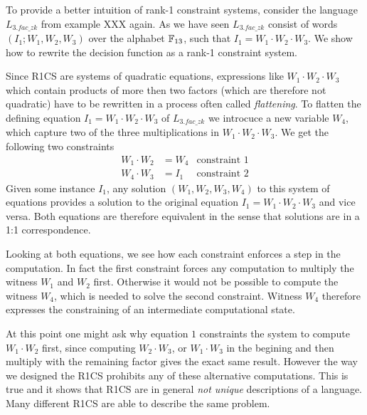 \begin{example}[3-Factorization] To provide a better intuition of rank-1 constraint systems, consider the language $L_{3.fac\_zk}$ from example XXX again. As we have seen $L_{3.fac\_zk}$ consist of words $(I_1;W_1,W_2,W_3)$ over the alphabet $\mathbb{F}_{13}$, such that $I_1 = W_1\cdot W_2\cdot W_3$. We show how to rewrite the decision function as a rank-1 constraint system.

Since R1CS are systems of quadratic equations, expressions like $W_1\cdot W_2\cdot W_3$ which contain products of more then two factors (which are therefore not quadratic) have to be rewritten in a process often called \textit{flattening}. To flatten the defining equation $I_1 = W_1\cdot W_2\cdot W_3$ of $L_{3.fac\_zk}$ we introcuce a new variable $W_4$, which capture two of the three multiplications in $W_1\cdot W_2\cdot W_3$. We get the following two constraints
\begin{align*}
W_1 \cdot W_2 & = W_4 & \text{constraint } 1\\
W_4 \cdot W_3 & = I_1 & \text{constraint } 2
\end{align*}
Given some instance $I_1$, any solution $(W_1,W_2,W_3,W_4)$ to this system of equations provides a solution to the original equation $I_1 = W_1\cdot W_2\cdot W_3$ and vice versa. Both equations are therefore equivalent in the sense that solutions are in a 1:1 correspondence.

Looking at both equations, we see how each constraint enforces a step in the computation. In fact the first constraint forces any computation to multiply the witness $W_1$ and $W_2$ first. Otherwise it would not be possible to compute the witness $W_4$, which is needed to solve the second constraint. Witness $W_4$ therefore expresses the constraining of an intermediate computational state.

At this point one might ask why equation $1$ constraints the system to compute $W_1\cdot W_2$ first, since computing $W_2\cdot W_3$, or $W_1\cdot W_3$ in the begining and then multiply with the remaining factor gives the exact same result. However the way we designed the R1CS prohibits any of these alternative computations. This is true and it shows that R1CS are in general \textit{not unique} descriptions of a language. Many different R1CS are able to describe the same problem.


\end{example}
